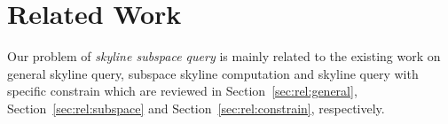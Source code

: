 
%
%

\chapter{Related Work}
\label{ch:related-work}

Our problem of \emph{skyline subspace query} is mainly related to the existing work on general skyline query, subspace skyline computation and skyline query with specific constrain which are reviewed in Section~\ref{sec:rel:general}, Section~\ref{sec:rel:subspace} and Section~\ref{sec:rel:constrain}, respectively.


